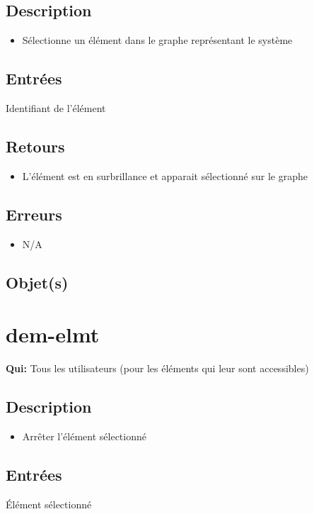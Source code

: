 	\subsection{Description}
	\begin{itemize}
		\item Sélectionne un élément dans le graphe représentant le système
	\end{itemize}

	\subsection{Entrées}
		Identifiant de l'élément

	\subsection{Retours}
	\begin{itemize}
		\item L'élément est en surbrillance et apparait sélectionné sur le graphe
	\end{itemize}

	\subsection{Erreurs}
	\begin{itemize}
		\item N/A
	\end{itemize}

	\subsection{Objet(s)}
		\allobjs

\section{dem-elmt}
	\textbf{Qui:} Tous les utilisateurs (pour les éléments qui leur sont accessibles)

	\subsection{Description}
	\begin{itemize}
		\item Arrêter l'élément sélectionné
	\end{itemize}

	\subsection{Entrées}
		Élément sélectionné

